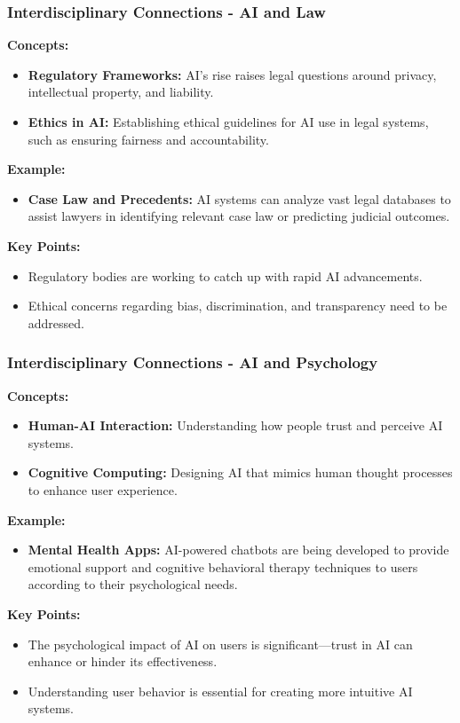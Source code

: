 \documentclass[aspectratio=169]{beamer}
\begin{document}
\begin{frame}[fragile]
    \frametitle{Interdisciplinary Connections - AI and Law}
    \textbf{Concepts:}
    \begin{itemize}
        \item \textbf{Regulatory Frameworks:} AI's rise raises legal questions around privacy, intellectual property, and liability.
        \item \textbf{Ethics in AI:} Establishing ethical guidelines for AI use in legal systems, such as ensuring fairness and accountability.
    \end{itemize}

    \textbf{Example:}
    \begin{itemize}
        \item \textbf{Case Law and Precedents:} AI systems can analyze vast legal databases to assist lawyers in identifying relevant case law or predicting judicial outcomes.
    \end{itemize}

    \textbf{Key Points:}
    \begin{itemize}
        \item Regulatory bodies are working to catch up with rapid AI advancements.
        \item Ethical concerns regarding bias, discrimination, and transparency need to be addressed.
    \end{itemize}
\end{frame}

\begin{frame}[fragile]
    \frametitle{Interdisciplinary Connections - AI and Psychology}
    \textbf{Concepts:}
    \begin{itemize}
        \item \textbf{Human-AI Interaction:} Understanding how people trust and perceive AI systems.
        \item \textbf{Cognitive Computing:} Designing AI that mimics human thought processes to enhance user experience.
    \end{itemize}

    \textbf{Example:}
    \begin{itemize}
        \item \textbf{Mental Health Apps:} AI-powered chatbots are being developed to provide emotional support and cognitive behavioral therapy techniques to users according to their psychological needs.
    \end{itemize}

    \textbf{Key Points:}
    \begin{itemize}
        \item The psychological impact of AI on users is significant—trust in AI can enhance or hinder its effectiveness.
        \item Understanding user behavior is essential for creating more intuitive AI systems.
    \end{itemize}
\end{frame}
\end{document}
